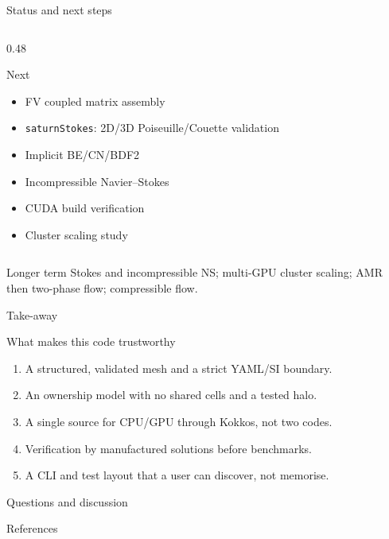 \documentclass[aspectratio=169,10pt]{beamer}
\begin{document}
\begin{frame}{Status and next steps}
\begin{columns}[T]
\begin{column}{0.48\textwidth}
\begin{block}{Next}
        \begin{itemize}
          \item FV coupled matrix assembly
          \item \texttt{saturnStokes}: 2D/3D Poiseuille/Couette validation
          \item Implicit BE/CN/BDF2
          \item Incompressible Navier--Stokes
          \item CUDA build verification
          \item Cluster scaling study
        \end{itemize}
      \end{block}
    \end{column}
  \end{columns}

  \vspace{0.6em}
  \begin{block}{Longer term}
    Stokes and incompressible NS; multi-GPU cluster scaling; AMR then two-phase
    flow; compressible flow.
  \end{block}
\end{frame}

\begin{frame}{Take-away}
  \begin{block}{What makes this code trustworthy}
    \begin{enumerate}
      \item A structured, validated mesh and a strict YAML/SI boundary.
      \item An ownership model with no shared cells and a tested halo.
      \item A single source for CPU/GPU through Kokkos, not two codes.
      \item Verification by manufactured solutions before benchmarks.
      \item A CLI and test layout that a user can discover, not memorise.
    \end{enumerate}
  \end{block}

  \vspace{0.8em}
  \centering
  \Large
  Questions and discussion
\end{frame}

\begin{frame}[allowframebreaks]{References}
  
  
\end{frame}
\end{document}
